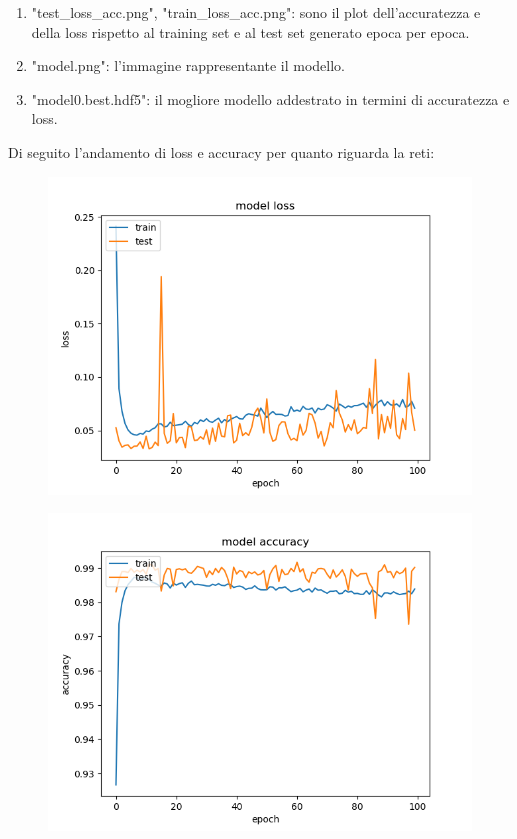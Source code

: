 \documentclass[12pt]{article}
\begin{document}
\begin{enumerate}
    \item "test\_loss\_acc.png", "train\_loss\_acc.png": sono il plot dell'accuratezza e della loss
    rispetto al training set e al test set generato epoca per epoca.
    \item "model.png": l'immagine rappresentante il modello.
    \item "model0.best.hdf5": il mogliore modello addestrato in termini di accuratezza e loss.
\end{enumerate}

Di seguito l'andamento di loss e accuracy per quanto riguarda la reti:

\begin{figure}[H]{}
    \centering
    \includegraphics[scale=0.8]{../mnist_models/CNN2D_type0-batch128-balanced/0test_loss_acc.png}
    \label{fig:cc}
\end{figure}

\begin{figure}[H]{}
    \centering
    \includegraphics[scale=0.8]{../mnist_models/CNN2D_type0-batch128-balanced/0train_loss_acc.png}
    \label{fig:cc}
\end{figure}
\end{document}
